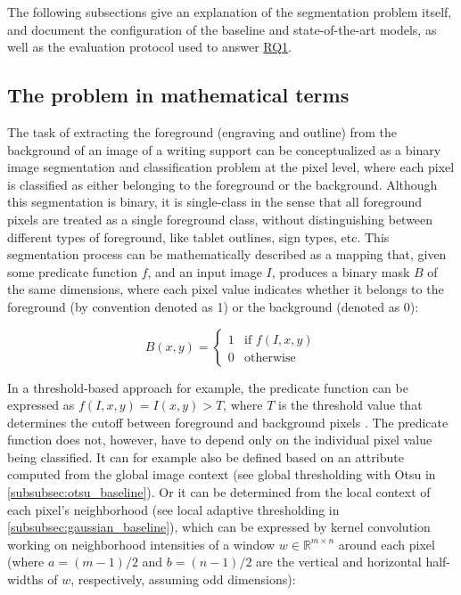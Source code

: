 The following subsections give an explanation of the segmentation problem itself, and document the configuration of the baseline and state-of-the-art models, as well as the evaluation protocol used to answer \hyperref[rq1]{\acs{RQ}1}.

\subsection{The problem in mathematical terms}

The task of extracting the foreground (engraving and outline) from the background of an image of a writing support can be conceptualized as a binary image segmentation and classification problem at the pixel level, where each pixel is classified as either belonging to the foreground or the background.
Although this segmentation is binary, it is single-class in the sense that all foreground pixels are treated as a single foreground class, without distinguishing between different types of foreground, like tablet outlines, sign types, etc.
This segmentation process can be mathematically described as a mapping that, given some predicate function $f$, and an input image $I$, produces a binary mask $B$ of the same dimensions, where each pixel value indicates whether it belongs to the foreground (by convention denoted as 1) or the background (denoted as 0):

$$ B(x,y) = \begin{cases}
    1 & \text{if } f(I,x,y) \\
    0 & \text{otherwise} \end{cases} $$ 

\noindent In a threshold-based approach for example, the predicate function can be expressed as $f(I,x,y) = I(x,y) > T$, where $T$ is the threshold value that determines the cutoff between foreground and background pixels \parencite[p.~743]{DigitalImageProcessing}.
The predicate function does not, however, have to depend only on the individual pixel value being classified.
It can for example also be defined based on an attribute computed from the global image context (see global thresholding with Otsu in \cref{subsubsec:otsu_baseline}).
Or it can be determined from the local context of each pixel's neighborhood (see local adaptive thresholding in \cref{subsubsec:gaussian_baseline}), which can be expressed by kernel convolution working on neighborhood intensities of a window $w \in \mathbb{R}^{m \times n}$ around each pixel \parencite[p.~157,159]{DigitalImageProcessing} (where $a=(m-1)/2$ and $b=(n-1)/2$ are the vertical and horizontal half-widths of $w$, respectively, assuming odd dimensions):

